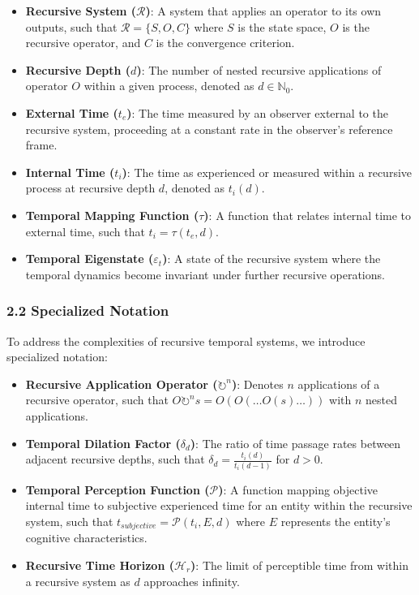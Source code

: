 \documentclass[
]{article}
\begin{document}
\begin{itemize}
\item
  \textbf{Recursive System (\(\mathcal{R}\))}: A system that applies an
  operator to its own outputs, such that \(\mathcal{R} = \{S, O, C\}\)
  where \(S\) is the state space, \(O\) is the recursive operator, and
  \(C\) is the convergence criterion.
\item
  \textbf{Recursive Depth (\(d\))}: The number of nested recursive
  applications of operator \(O\) within a given process, denoted as
  \(d \in \mathbb{N}_0\).
\item
  \textbf{External Time (\(t_e\))}: The time measured by an observer
  external to the recursive system, proceeding at a constant rate in the
  observer's reference frame.
\item
  \textbf{Internal Time (\(t_i\))}: The time as experienced or measured
  within a recursive process at recursive depth \(d\), denoted as
  \(t_i(d)\).
\item
  \textbf{Temporal Mapping Function (\(\tau\))}: A function that relates
  internal time to external time, such that \(t_i = \tau(t_e, d)\).
\item
  \textbf{Temporal Eigenstate (\(\varepsilon_t\))}: A state of the
  recursive system where the temporal dynamics become invariant under
  further recursive operations.
\end{itemize}

\subsubsection{2.2 Specialized Notation}\label{specialized-notation}

To address the complexities of recursive temporal systems, we introduce
specialized notation:

\begin{itemize}
\item
  \textbf{Recursive Application Operator (\(\circlearrowright^n\))}:
  Denotes \(n\) applications of a recursive operator, such that
  \(O \circlearrowright^n s = O(O(\ldots O(s)\ldots))\) with \(n\)
  nested applications.
\item
  \textbf{Temporal Dilation Factor (\(\delta_d\))}: The ratio of time
  passage rates between adjacent recursive depths, such that
  \(\delta_d = \frac{t_i(d)}{t_i(d-1)}\) for \(d > 0\).
\item
  \textbf{Temporal Perception Function (\(\mathcal{P}\))}: A function
  mapping objective internal time to subjective experienced time for an
  entity within the recursive system, such that
  \(t_{subjective} = \mathcal{P}(t_i, E, d)\) where \(E\) represents the
  entity's cognitive characteristics.
\item
  \textbf{Recursive Time Horizon (\(\mathcal{H}_r\))}: The limit of
  perceptible time from within a recursive system as \(d\) approaches
  infinity.
\end{itemize}
\end{document}
